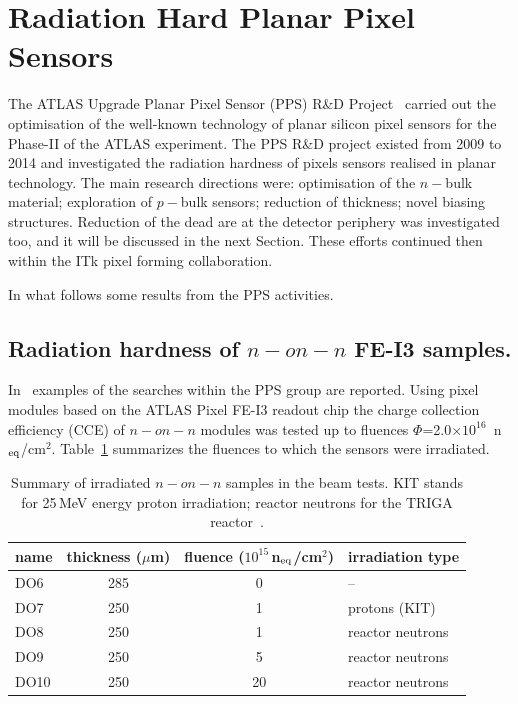 \section{Radiation Hard Planar Pixel Sensors}
\label{sec:radhardpixels}

The ATLAS Upgrade Planar Pixel Sensor (PPS) R\&D Project~\cite{PPS:proj} carried out the optimisation of the 
well-known technology of planar silicon pixel sensors for the Phase-II of the ATLAS experiment. 
The PPS R\&D project existed from 2009 to 2014 and investigated the radiation hardness of 
pixels sensors realised in planar technology. The main research directions were: optimisation 
of the $n-$bulk material; exploration of $p-$bulk sensors; reduction of thickness; novel biasing 
structures.  
Reduction of the dead are at the detector periphery was investigated too, and it will be discussed in the 
next Section. 
These efforts   continued then within the ITk pixel forming collaboration. 

In what follows some results from the PPS activities.

\subsection{Radiation hardness of $n-on-n$ FE-I3 samples.}
In~\cite{BOMBEN2012940,1748-0221-7-10-P10028} examples of the searches within the PPS group 
are reported. Using pixel modules based on the ATLAS Pixel FE-I3 readout chip the charge collection 
efficiency (CCE) of $n-on-n$ modules was tested up to fluences 
$\Phi$=2.0$\times10^{16}$~n$_{\rm eq}$/cm$^2$. Table~\ref{tab:n-in-n} summarizes the fluences to which 
the sensors were irradiated.

\begin{table}[!htb]
\caption{\label{tab:n-in-n}Summary of irradiated $n-on-n$ samples in the beam tests. KIT stands for 25\,MeV energy proton irradiation; reactor neutrons for the TRIGA reactor~\cite{SNOJ2011136}.
}
\begin{center}
\begin{tabular}{l|c|c|l}
name & thickness ($\mu$m)  & fluence ($10^{15}$\,n$_{\rm eq}$/cm$^2$) & irradiation type\\
\hline \hline
DO6 & 285 & 0 & -- \\
DO7 & 250 & 1 & protons (KIT)  \\
DO8 & 250 & 1 & reactor neutrons  \\
DO9 & 250 & 5 & reactor neutrons \\
DO10 & 250 & 20 & reactor neutrons \\
\hline
\end{tabular}
\end{center}
\end{table} 

